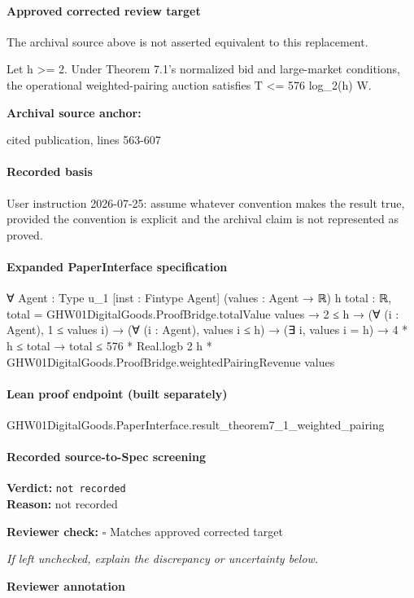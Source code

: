 \documentclass[10pt]{article}
\newcommand{\reviewerbox}{%
  \par\noindent\fbox{\parbox{0.96\linewidth}{\rule{0pt}{0.38in}}}\par
}
\newcommand{\reviewmatch}[1]{%
  \par\noindent\textbf{Reviewer check:} $\square$\; #1\par
  \noindent\emph{If left unchecked, explain the discrepancy or uncertainty below.}\par
}
\begin{document}
\paragraph{Approved corrected review target}
The archival source above is not asserted equivalent to this replacement.
\begin{ReviewVerbatim}
Let h >= 2. Under Theorem 7.1's normalized bid and large-market conditions, the operational weighted-pairing auction satisfies T <= 576 log_2(h) W.
\end{ReviewVerbatim}

\textbf{Archival source anchor:} {\footnotesize\raggedright cited publication, lines 563-\allowbreak{}607\par}
\paragraph{Recorded basis}
User instruction 2026-\allowbreak{}07-\allowbreak{}25:\allowbreak{} assume whatever convention makes the result true, provided the convention is explicit and the archival claim is not represented as proved.\allowbreak{}
\paragraph{Expanded PaperInterface specification}
\begin{ReviewVerbatim}
∀ {Agent : Type u_1} [inst : Fintype Agent] (values : Agent → ℝ) {h total : ℝ},
  total = GHW01DigitalGoods.ProofBridge.totalValue values →
    2 ≤ h →
      (∀ (i : Agent), 1 ≤ values i) →
        (∀ (i : Agent), values i ≤ h) →
          (∃ i, values i = h) →
            4 * h ≤ total → total ≤ 576 * Real.logb 2 h * GHW01DigitalGoods.ProofBridge.weightedPairingRevenue values
\end{ReviewVerbatim}

\paragraph{Lean proof endpoint (built separately)}\begin{ReviewVerbatim}
GHW01DigitalGoods.PaperInterface.result_theorem7_1_weighted_pairing
\end{ReviewVerbatim}

\paragraph{Recorded source-to-Spec screening}
\textbf{Verdict:} \texttt{not recorded}
\\
\textbf{Reason:} not recorded
\reviewmatch{Matches approved corrected target}
\noindent\textbf{Reviewer annotation}\par
\reviewerbox
\clearpage
\hypertarget{source-claim-d2203fdcdcb5c29a}{}
\end{document}
